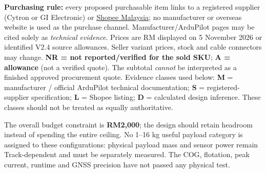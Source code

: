 \textbf{Purchasing rule:} every proposed purchasable item links to a registered supplier (Cytron or GI Electronic) or \href{https://shopee.com.my}{Shopee Malaysia}; no manufacturer or overseas website is used as the purchase channel. Manufacturer/ArduPilot pages may be cited solely as \emph{technical evidence}. Prices are RM displayed on 5 November 2026 or identified V2.4 source allowances. Seller variant prices, stock and cable connectors may change. \textbf{NR = not reported/verified for the sold SKU}; \textbf{A = allowance} (not a verified quote). The subtotal \emph{cannot} be interpreted as a finished approved procurement quote. Evidence classes used below: \textbf{M} = manufacturer / official ArduPilot technical documentation; \textbf{S} = registered-supplier specification; \textbf{L} = Shopee listing; \textbf{D} = calculated design inference. These classes should not be treated as equally authoritative.

The overall budget constraint is \textbf{RM2,000}; the design should retain headroom instead of spending the entire ceiling. No 1--16 kg useful payload category is assigned to these configurations: physical payload mass and sensor power remain Track-dependent and must be separately measured. The COG, flotation, peak current, runtime and GNSS precision have not passed any physical test.

